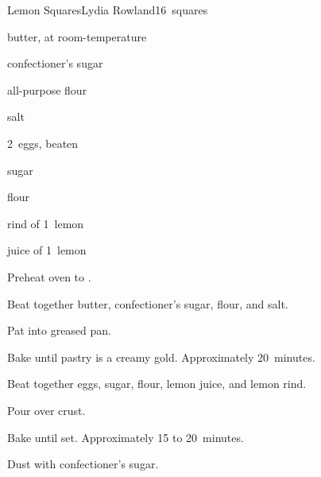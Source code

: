 \begin{recipe}{Lemon Squares}{Lydia Rowland}{16~squares}

\begin{ingredients}
\item \C{\half} butter, at room-temperature
\item \C{\quarter} confectioner's sugar
\item {} all-purpose flour
\item \tp{\half} salt
\item 2~eggs, beaten
\item {} sugar
\item {} flour
\item rind of 1~lemon
\item juice of 1~lemon
\end{ingredients}

\begin{directions}
\item Preheat oven to .
\item Beat together butter, confectioner's sugar,  flour, and salt.
\item Pat into  greased pan.
\item Bake until pastry is a creamy gold. Approximately 20~minutes.
\item Beat together eggs, sugar,  flour, lemon juice, and lemon rind.
\item Pour over crust.
\item Bake until set. Approximately 15 to 20~minutes.
\item Dust with confectioner's sugar.
\end{directions}

\end{recipe}
